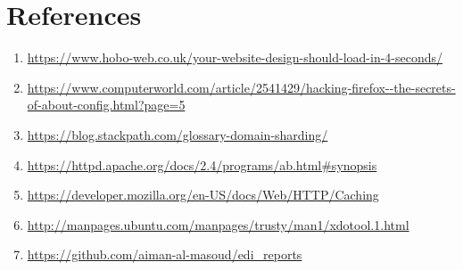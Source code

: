 \documentclass[a4paper,10pt]{article}
\begin{document}
\clearpage


\section{References}

\begin{enumerate}

\item \label{article1} \url{https://www.hobo-web.co.uk/your-website-design-should-load-in-4-seconds/} 

\item \label{article2} \url{https://www.computerworld.com/article/2541429/hacking-firefox--the-secrets-of-about-config.html?page=5} 

\item \label{article3} \url{https://blog.stackpath.com/glossary-domain-sharding/} 

\item \label{article4} \url{https://httpd.apache.org/docs/2.4/programs/ab.html#synopsis} 

\item \label{article5} \url{https://developer.mozilla.org/en-US/docs/Web/HTTP/Caching} 

\item \label{article6} \url{http://manpages.ubuntu.com/manpages/trusty/man1/xdotool.1.html} 

\item \label{article7} \url{https://github.com/aiman-al-masoud/edi_reports} 


\end{enumerate}
\end{document}
